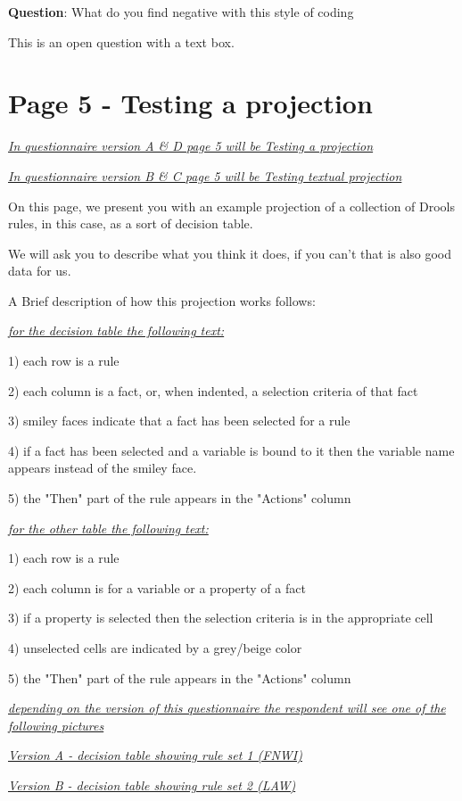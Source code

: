 \textbf{Question}: What do you find negative with this style of coding

This is an open question with a text box.

\section{Page 5 - Testing a projection}
\emph{\underline{In questionnaire version A \& D page 5 will be Testing a projection}}

\emph{\underline{In questionnaire version B \& C page 5 will be Testing textual projection}}

On this page, we present you with an example projection of a collection of Drools rules, in this case, as a sort of decision table.

We will ask you to describe what you think it does, if you can't that is also good data for us.

A Brief description of how this projection works follows:

\emph{\underline{for the decision table the following text:}}

1) each row is a rule

2) each column is a fact, or, when indented, a selection criteria of that fact

3) smiley faces indicate that a fact has been selected for a rule

4) if a fact has been selected and a variable is bound to it then the variable name appears instead of the smiley face.

5) the "Then" part of the rule appears in the "Actions" column

\emph{\underline{for the other table the following text:}}

1) each row is a rule

2) each column is for a variable or a property of a fact

3) if a property is selected then the selection criteria is in the appropriate cell

4) unselected cells are indicated by a grey/beige color

5) the "Then" part of the rule appears in the "Actions" column


\emph{\underline{depending on the version of this questionnaire the respondent will see one of the following pictures}}

\emph{\underline{Version A - decision table showing rule set 1 (FNWI)}}

\emph{\underline{Version B - decision table showing rule set 2 (LAW)}}

